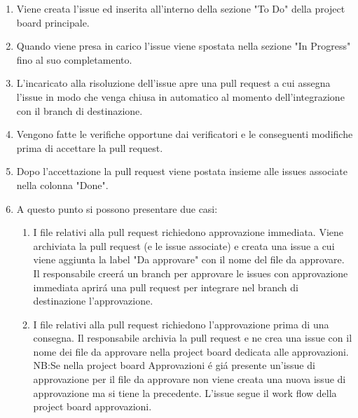 \begin{enumerate}
	\item Viene creata l'issue ed inserita all'interno della sezione "To Do" della project board principale.
	\item Quando viene presa in carico l'issue viene spostata nella sezione "In Progress" fino al suo completamento.
	\item L'incaricato alla risoluzione dell'issue apre una pull request a cui assegna l'issue in modo che  venga chiusa in automatico al momento dell'integrazione con il branch di destinazione.
	\item Vengono fatte le verifiche opportune dai verificatori e le conseguenti modifiche prima di accettare la pull request.
	\item Dopo l'accettazione la pull request viene postata insieme alle issues associate nella colonna "Done".
	\item A questo punto si possono presentare due casi: 
	\begin{enumerate}
		\item I file relativi alla pull request richiedono approvazione immediata.
		Viene archiviata la pull request (e le issue associate) e creata una issue a cui viene aggiunta la label "Da approvare" con il nome del file da approvare.
		Il responsabile creerá un branch per approvare le issues con approvazione immediata aprirá una pull request per integrare nel branch di destinazione l'approvazione.
		\item I file relativi alla pull request richiedono l'approvazione prima di una consegna.
		Il responsabile archivia la pull request e ne crea una issue con il nome dei file da approvare nella project board dedicata alle approvazioni.
		NB:Se nella project board Approvazioni é giá presente un'issue di approvazione per il file da approvare non viene creata una nuova issue di approvazione ma si tiene la precedente.
		L'issue segue il work flow della project board approvazioni.
	\end{enumerate}
\end{enumerate}
